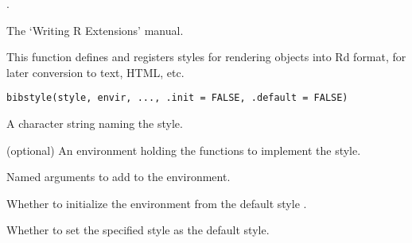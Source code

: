 %
\begin{SeeAlso}\relax
{}.

The `Writing R Extensions' manual.
\end{SeeAlso}
%
\begin{Description}\relax
This function defines and registers styles for rendering  objects
into Rd format, for later conversion to text, HTML, etc.
\end{Description}
%
\begin{Usage}
\begin{verbatim}
bibstyle(style, envir, ..., .init = FALSE, .default = FALSE)
\end{verbatim}
\end{Usage}
%
\begin{Arguments}
\begin{ldescription}
\item[\code{style}] 
A character string naming the style.

\item[\code{envir}] 
(optional) An environment holding the functions to implement the style.

\item[\code{...}] 
Named arguments to add to the environment.

\item[\code{.init}] 
Whether to initialize the environment from the default style .

\item[\code{.default}] 
Whether to set the specified style as the default style.

\end{ldescription}
\end{Arguments}
%
